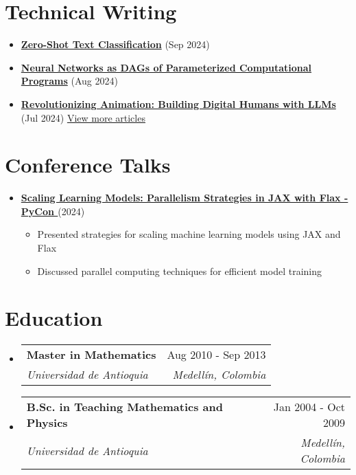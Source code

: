 \documentclass[letterpaper,11pt]{article}
\makeatletter
\newcommand{\resumeSubheading}[4]{
  \vspace{-2pt}
  \item[]
  \begin{tabular*}{\textwidth}{@{\extracolsep{\fill}}l r}
    \textbf{#1} & #2 \\
    \textit{#3} & \textit{#4} \\
  \end{tabular*}
  \vspace{-5pt}
}
\newcommand{\normalfaExternalLink}{{\mdseries\faExternalLink}}
\newcommand{\normalfaYoutube}{{\mdseries\faYoutube}}
\makeatother
\begin{document}
\section{Technical Writing}
\begin{itemize}[leftmargin=*, itemsep=0pt]
    \item \textbf{\href{https://www.asanchezyali.com/blog/en/ai/20240917ZeroShot}{Zero-Shot Text Classification}} (Sep 2024)
    \item \textbf{\href{https://www.asanchezyali.com/blog/en/differentiable-programming/20240923DifferentiablePrograms}{Neural Networks as DAGs of Parameterized Computational Programs}} (Aug 2024)
    \item \textbf{\href{https://www.asanchezyali.com/blog/en/ai-avatars/20240703DigitalHuman}{Revolutionizing Animation: Building Digital Humans with LLMs}} (Jul 2024)
    \href{https://www.asanchezyali.com/}{View more articles \normalfaExternalLink}
\end{itemize}

\section{Conference Talks}
\begin{itemize}[leftmargin=*]
    \item \textbf{\href{https://www.youtube.com/watch?v=m4hP1soE414}{Scaling Learning Models: Parallelism Strategies in JAX with Flax - PyCon \normalfaYoutube}} (2024)
    \begin{itemize}[itemsep=0pt]
        \item Presented strategies for scaling machine learning models using JAX and Flax
        \item Discussed parallel computing techniques for efficient model training
    \end{itemize}
\end{itemize}

\section{Education}
\begin{itemize}[leftmargin=0pt, itemindent=0pt, label={}]
\resumeSubheading
{Master in Mathematics}{Aug 2010 - Sep 2013}
{Universidad de Antioquia}{Medellín, Colombia}

\resumeSubheading
{B.Sc. in Teaching Mathematics and Physics}{Jan 2004 - Oct 2009}
{Universidad de Antioquia}{Medellín, Colombia}
\end{itemize}
\end{document}
